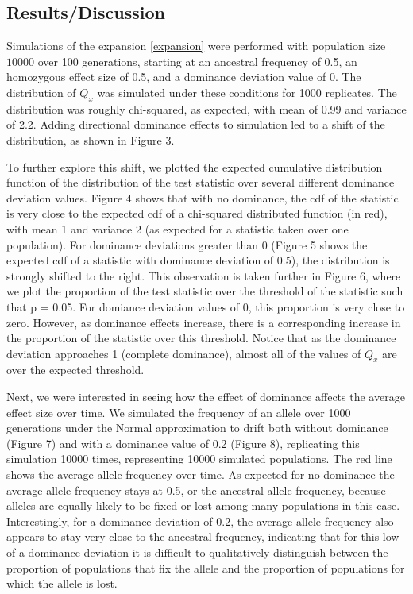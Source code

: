 \documentclass[a4paper,12pt]{article}
\begin{document}
\subsection*{Results/Discussion}
Simulations of the expansion \eqref{expansion} were performed with
population size $10000$ over 100 generations, starting at an ancestral
frequency of 0.5, an homozygous effect size of 0.5, and a dominance
deviation value of 0. The distribution of $Q_x$ was simulated under
these conditions for 1000 replicates. The distribution was roughly
chi-squared, as expected, with mean of 0.99 and variance of
2.2. Adding directional dominance effects to simulation led to a shift of the
distribution, as shown in Figure 3.

To further explore this shift, we plotted the expected cumulative
distribution function of the distribution of the test statistic over
several different dominance deviation values. Figure 4 shows that with
no dominance, the cdf of the statistic is very close to the expected
cdf of a chi-squared distributed function (in red), with mean 1 and variance 2
(as expected for a statistic taken over one population). For dominance
deviations greater than 0 (Figure 5 shows the expected cdf of a
statistic with dominance deviation of 0.5), the distribution is
strongly shifted to the right. This observation is taken further in
Figure 6, where we plot the proportion of the test statistic over the
threshold of the statistic such that p = 0.05. For domiance deviation
values of 0, this proportion is very close to zero. However, as
dominance effects increase, there is a corresponding increase in the
proportion of the statistic over this threshold. Notice that as the
dominance deviation approaches 1 (complete dominance), almost all of
the values of $Q_x$ are  over the expected threshold.

Next, we were interested in seeing how the effect of dominance affects
the average effect size over time. We simulated the frequency of an
allele over 1000 generations under the Normal approximation to drift
both without dominance (Figure 7) and with a dominance value of 0.2
(Figure 8), replicating this simulation 10000 times, representing 10000
simulated populations. The red line shows the average allele frequency
over time. As expected for no dominance the average allele frequency
stays at 0.5, or the ancestral allele frequency, because alleles
are equally likely to be fixed or lost among many populations in this
case. Interestingly, for a dominance deviation of 0.2, the average allele
frequency also appears to stay very close to the ancestral frequency,
indicating that for this low of a dominance deviation it is difficult
to qualitatively distinguish between the proportion of populations
that fix the allele and the proportion of populations for which the
allele is lost.
\end{document}
